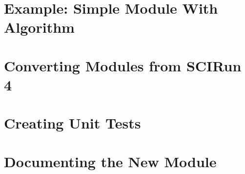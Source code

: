 \documentclass[fleqn,11pt,openany]{book}
\begin{document}
\chapter{Example: Simple Module With Algorithm}

\begin{introduction}
\end{introduction}



\chapter{Converting Modules from SCIRun 4}

\begin{introduction}
\end{introduction}

\chapter{Creating Unit Tests}

\begin{introduction}
\end{introduction}

\chapter{Documenting the New Module}

\begin{introduction}
\end{introduction}




\end{document}

